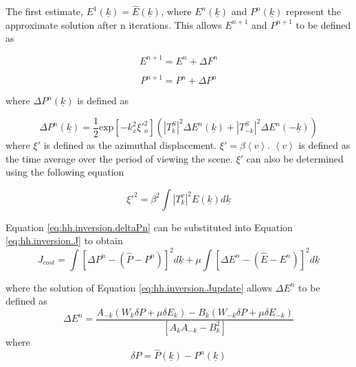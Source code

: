 The first estimate, $E^1(\underline{k}) = \hat{E}(\underline{k})$, where $E^n(\underline{k})$ and $P^n(\underline{k})$ represent the approximate solution after n iterations. This allows $E^{n+1}$ and $P^{n+1}$ to be defined as

\begin{equation} \label{eq:hh.inversion.Fn+1}
    E^{n+1} = E^n + \Delta F^n
\end{equation}

\begin{equation} \label{eq:hh.inversion.Pn+1}
    P^{n+1} = P^n + \Delta P^n
\end{equation}

where $\Delta P^n(\underline{k})$  is defined as

\begin{equation} \label{eq:hh.inversion.deltaPn}
    \Delta P^n(\underline{k}) = \frac{1}{2} \text{exp} \left [ -k^2_x {\xi}'^2_n \right ] \left ( \left | T^S_k \right |^2 \Delta E^n(\underline{k}) + \left | T^S_{-k} \right |^2 \Delta E^n(-\underline{k}) \right )
\end{equation}
where $\xi'$ is defined as the azimuthal displacement. $\xi' = \beta \left \langle v \right \rangle$. $\left \langle v \right \rangle$ is defined as the time average over the period of viewing the scene. $\xi'$ can also be determined using the following equation \cite{Hasselmann1991,Wadhams2002}

\begin{equation} \label{eq:hh.inversion.xi}
    \xi'^{2} = \beta ^{2} \int \left | T^{v}_k \right | ^2 E(\underline{k}) d\underline{k}
\end{equation}

Equation \ref{eq:hh.inversion.deltaPn} can be substituted into Equation \ref{eq:hh.inversion.J} to obtain
\begin{equation} \label{eq:hh.inversion.Jupdate}
    J_{cost} = \int \left [ \Delta P^n - \left ( \hat{P} - P^n \right ) \right ]^2 d\underline{k} + \mu \int \left [ \Delta E^n - \left ( \hat{E} - E^n \right )  \right ]^2 d\underline{k}
\end{equation}

where the solution of Equation \ref{eq:hh.inversion.Jupdate} allows $\Delta E^n$ to be defined as \cite{Hasselmann1991}
\begin{equation}
    \Delta E^n = \frac{A_{-k}(W_k \delta P + \mu \delta E_k) - B_k(W_{-k} \delta P + \mu\delta E_{-k})}{\left [ A_kA_{-k} - B^2_k  \right ]}
\end{equation}
where
\begin{equation} \label{eq:hh.inversion.deltaP}
    \delta P = \hat{P}(\underline{k}) - P^n(\underline{k})
\end{equation}

